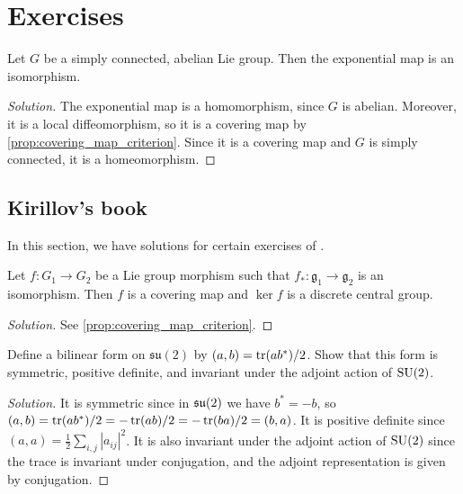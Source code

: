 \documentclass{report}
\begin{document}
\chapter{Exercises}
\begin{exercise}
    Let $G$ be a simply connected, abelian Lie group.
    Then the exponential map is an isomorphism.
\end{exercise}
\begin{proof}[Solution]
    The exponential map is a homomorphism, since $G$ is abelian.
    Moreover, it is a local diffeomorphism, so it is a covering map by \cref{prop:covering_map_criterion}.
    Since it is a covering map and $G$ is simply connected, it is a homeomorphism.
\end{proof}

\section{Kirillov's book}
In this section, we have solutions for certain exercises of \cite{kirillov2008introduction}.

\begin{exercise}[Exercise 2.3]
    Let $f:G_1 \to G_2$ be a Lie group morphism such that $f_*: \mathfrak g_1 \to \mathfrak g_2$ is an isomorphism.
    Then $f$ is a covering map and $\ker f$ is a discrete central group.
\end{exercise}
\begin{proof}[Solution]
    See \cref{prop:covering_map_criterion}.
\end{proof}
\begin{exercise}[Exercise 2.7]
Define a bilinear form on $\mathfrak{su}(2)$ by $(a, b) = \operatorname{tr}(ab^*)/2$. 
Show that this form is symmetric, positive deﬁnite, and invariant under the adjoint action of
$\operatorname{{\mathrm{SU}}}(2)$.
\end{exercise}
\begin{proof}[Solution]
    It is symmetric since in $\operatorname{{\mathfrak{su}}}(2)$ we have $b^* = -b$, so $(a,b) = \operatorname{tr}(ab^*)/2 = -\operatorname{tr}(ab)/2 = 
    -\operatorname{tr}(ba)/2 = (b,a)$.
    It is positive definite since $(a,a) = \frac{1}{2} \sum_{i,j} |a_{ij}|^2$.
    It is also invariant under the adjoint action of $\operatorname{{\mathrm{SU}}}(2)$ since the trace is invariant under conjugation, and the adjoint representation is given by conjugation.
\end{proof}
\end{document}
